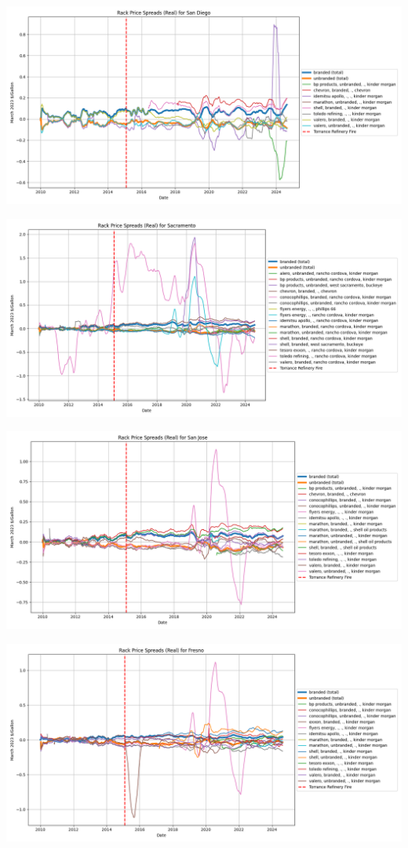 \documentclass{article}
\begin{document}
\includegraphics[width=7in]{san diego_spread.png}

\includegraphics[width=7in]{sacramento_spread.png}

\includegraphics[width=7in]{san jose_spread.png}

\includegraphics[width=7in]{fresno_spread.png}
\end{document}
